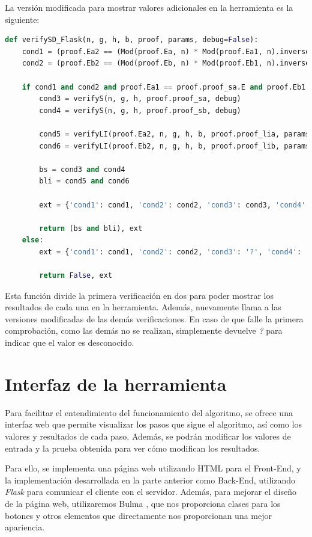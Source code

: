 La versión modificada para mostrar valores adicionales en la herramienta es la siguiente:
\begin{lstlisting}[language=Python, basicstyle=\footnotesize]
def verifySD_Flask(n, g, h, b, proof, params, debug=False):
    cond1 = (proof.Ea2 == (Mod(proof.Ea, n) * Mod(proof.Ea1, n).inverse()).x)
    cond2 = (proof.Eb2 == (Mod(proof.Eb, n) * Mod(proof.Eb1, n).inverse()).x)

    if cond1 and cond2 and proof.Ea1 == proof.proof_sa.E and proof.Eb1 == proof.proof_sb.E:
        cond3 = verifyS(n, g, h, proof.proof_sa, debug)
        cond4 = verifyS(n, g, h, proof.proof_sb, debug)

        cond5 = verifyLI(proof.Ea2, n, g, h, b, proof.proof_lia, params, debug)
        cond6 = verifyLI(proof.Eb2, n, g, h, b, proof.proof_lib, params, debug)

        bs = cond3 and cond4
        bli = cond5 and cond6

        ext = {'cond1': cond1, 'cond2': cond2, 'cond3': cond3, 'cond4': cond4, 'cond5': cond5, 'cond6': cond6}

        return (bs and bli), ext
    else:
        ext = {'cond1': cond1, 'cond2': cond2, 'cond3': '?', 'cond4': '?', 'cond5': '?', 'cond6': '?'}

        return False, ext
\end{lstlisting}

Esta función divide la primera verificación en dos para poder mostrar los resultados de cada una en la herramienta. Además, nuevamente llama a las versiones modificadas de las demás verificaciones. En caso de que falle la primera comprobación, como las demás no se realizan, simplemente devuelve \emph{?} para indicar que el valor es desconocido.

\section{Interfaz de la herramienta}

Para facilitar el entendimiento del funcionamiento del algoritmo, se ofrece una interfaz web que permite visualizar los pasos que sigue el algoritmo, así como los valores y resultados de cada paso. Además, se podrán modificar los valores de entrada y la prueba obtenida para ver cómo modifican los resultados.

Para ello, se implementa una página web utilizando HTML para el Front-End, y la implementación desarrollada en la parte anterior como Back-End, utilizando \emph{Flask} para comunicar el cliente con el servidor. Además, para mejorar el diseño de la página web, utilizaremos Bulma \cite{Bulma}, que nos proporciona clases para los botones y otros elementos que directamente nos proporcionan una mejor apariencia.

